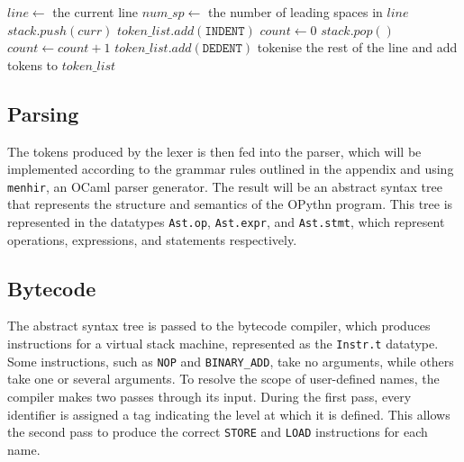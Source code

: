 \documentclass[11pt, twoside]{article}
\newcommand{\ms}{\texttt}
\begin{document}
    \begin{algorithm}
    \begin{algorithmic}
            \State $line \gets$ the current line
            \State $num\_sp \gets$ the number of leading spaces in $line$
                $stack.push(curr)$
                $token\_list.add(\ms{INDENT})$
                \State $count\gets 0$
                    \State $stack.pop()$
                    \State $count\gets count + 1$
                \EndWhile
                    \State $token\_list.add(\ms{DEDENT})$
                \EndFor
                \EndIf
                \State tokenise the rest of the line and add tokens to $token\_list$
        \EndWhile
        \State {}
    \EndProcedure
    \end{algorithmic}
    \end{algorithm}
    \subsection{Parsing}
    The tokens produced by the lexer is then fed into the parser, which will be implemented according to the grammar rules outlined in the appendix and using \texttt{menhir}, an OCaml parser generator. The result will be an abstract syntax tree that represents the structure and semantics of the OPythn program. This tree is represented in the datatypes \ms{Ast.op}, \ms{Ast.expr}, and \ms{Ast.stmt}, which represent operations, expressions, and statements respectively.

    \subsection{Bytecode}
    The abstract syntax tree is passed to the bytecode compiler, which produces instructions for a virtual stack machine, represented as the \ms{Instr.t} datatype. Some instructions, such as \ms{NOP} and \ms{BINARY\_ADD}, take no arguments, while others take one or several arguments. To resolve the scope of user-defined names, the compiler makes two passes through its input. During the first pass, every identifier is assigned a tag indicating the level at which it is defined. This allows the second pass to produce the correct \ms{STORE} and \ms{LOAD} instructions for each name.
\end{document}
